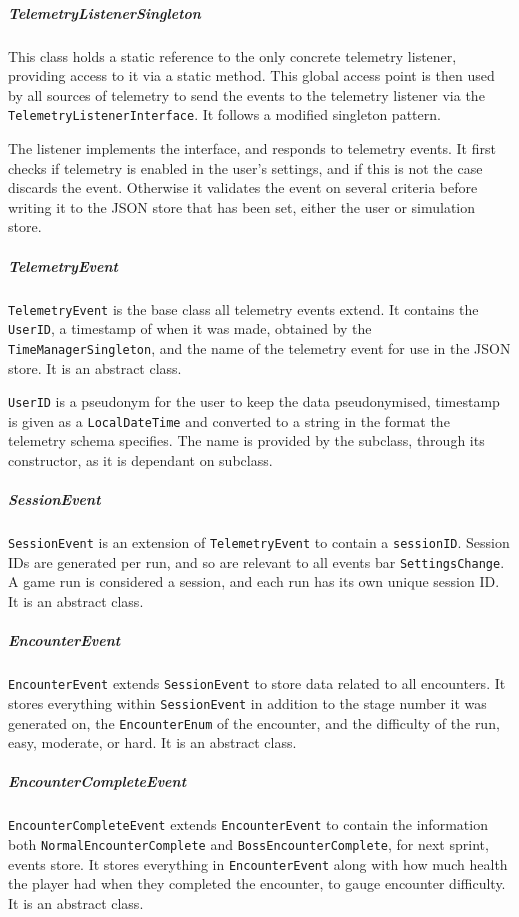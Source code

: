 \subparagraph{TelemetryListenerSingleton}
This class holds a static reference to the only concrete telemetry listener, providing access to it via a static method. This global access point is then used by all sources of telemetry to send the events to the telemetry listener via the \texttt{TelemetryListenerInterface}. It follows a modified singleton pattern.

The listener implements the interface, and responds to telemetry events. It first checks if telemetry is enabled in the user's settings, and if this is not the case discards the event. Otherwise it validates the event on several criteria before writing it to the JSON store that has been set, either the user or simulation store.

\subparagraph{TelemetryEvent}
\texttt{TelemetryEvent} is the base class all telemetry events extend. It contains the \texttt{UserID}, a timestamp of when it was made, obtained by the \texttt{TimeManagerSingleton}, and the name of the telemetry event for use in the JSON store. It is an abstract class.

\texttt{UserID} is a pseudonym for the user to keep the data pseudonymised, timestamp is given as a \texttt{LocalDateTime} and converted to a string in the format the telemetry schema specifies. The name is provided by the subclass, through its constructor, as it is dependant on subclass.

\subparagraph{SessionEvent}
\texttt{SessionEvent} is an extension of \texttt{TelemetryEvent} to contain a \texttt{sessionID}. Session IDs are generated per run, and so are relevant to all events bar \texttt{SettingsChange}. A game run is considered a session, and each run has its own unique session ID. It is an abstract class.

\subparagraph{EncounterEvent}
\texttt{EncounterEvent} extends \texttt{SessionEvent} to store data related to all encounters. It stores everything within \texttt{SessionEvent} in addition to the stage number it was generated on, the \texttt{EncounterEnum} of the encounter, and the difficulty of the run, easy, moderate, or hard. It is an abstract class.

\subparagraph{EncounterCompleteEvent}
\texttt{EncounterCompleteEvent} extends \texttt{EncounterEvent} to contain the information both \texttt{NormalEncounterComplete} and \texttt{BossEncounterComplete}, for next sprint, events store. It stores everything in \texttt{EncounterEvent} along with how much health the player had when they completed the encounter, to gauge encounter difficulty. It is an abstract class.


